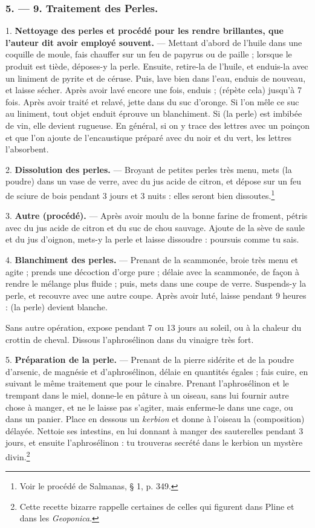 \documentclass[a4paper, 11pt, oneside, polutonikogreek, french]{article}
\begin{document}
\bigskip
\centerline{\EightStarTaper}
\centerline{\EightStarTaper\EightStarTaper}
\bigskip

\subsubsection{5. --- 9. Traitement des Perles.}

1. \textbf{Nettoyage des perles et procédé pour les rendre brillantes, que l'auteur dit avoir employé souvent.} --- Mettant d'abord de l'huile dans une coquille de moule, fais chauffer sur un feu de papyrus ou de paille ; lorsque le produit est tiède, déposes-y la perle. Ensuite, retire-la de l'huile, et enduis-la avec un liniment de pyrite et de céruse. Puis, lave bien dans l'eau, enduis de nouveau, et laisse sécher. Après avoir lavé encore une fois, enduis ; (répète cela) jusqu'à 7 fois. Après avoir traité et relavé, jette dans du suc d'oronge. Si l'on mêle ce suc au liniment, tout objet enduit éprouve un blanchiment. Si (la perle) est imbibée de vin, elle devient rugueuse. En général, si on y trace des lettres avec un poinçon et que l'on ajoute de l'encaustique préparé avec du noir et du vert, les lettres l'absorbent.

2. \textbf{Dissolution des perles.} --- Broyant de petites perles très menu, mets (la poudre) dans un vase de verre, avec du jus acide de citron, et dépose sur un feu de sciure de bois pendant 3 jours et 3 nuits : elles seront bien dissoutes.\footnote{Voir le procédé de Salmanas, § 1, p. 349.}

3. \textbf{Autre (procédé).} --- Après avoir moulu de la bonne farine de froment, pétris avec du jus acide de citron et du suc de chou sauvage. Ajoute de la sève de saule et du jus d'oignon, mets-y la perle et laisse dissoudre : poursuis comme tu sais.

4. \textbf{Blanchiment des perles.} --- Prenant de la scammonée, broie très menu et agite ; prends une décoction d'orge pure ; délaie avec la scammonée, de façon à rendre le mélange plus fluide ; puis, mets dans une coupe de verre. Suspends-y la perle, et recouvre avec une autre coupe. Après avoir luté, laisse pendant 9 heures : (la perle) devient blanche.

Sans autre opération, expose pendant 7 ou 13 jours au soleil, ou à la chaleur du crottin de cheval. Dissous l'aphrosélinon dans du vinaigre très fort.

5. \textbf{Préparation de la perle.} --- Prenant de la pierre sidérite et de la poudre d'arsenic, de magnésie et d'aphrosélinon, délaie en quantités égales ; fais cuire, en suivant le même traitement que pour le cinabre. Prenant l'aphrosélinon et le trempant dans le miel, donne-le en pâture à un oiseau, sans lui fournir autre chose à manger, et ne le laisse pas s'agiter, mais enferme-le dans une cage, ou dans un panier. Place en dessous un \emph{kerbion} et donne à l'oiseau la (composition) délayée. Nettoie ses intestins, en lui donnant à manger des sauterelles pendant 3 jours, et ensuite l'aphrosélinon : tu trouveras secrété dans le kerbion un mystère divin.\footnote{Cette recette bizarre rappelle certaines de celles qui figurent dans Pline et dans les \emph{Geoponica}.}
\end{document}
